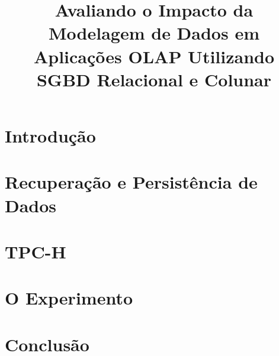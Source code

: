 \documentclass[12pt]{article}
\begin{document}
 

\title{Avaliando o Impacto da Modelagem de Dados em Aplicações OLAP Utilizando SGBD Relacional e Colunar}
\author{}
\address{}

\maketitle

\begin{abstract}
\end{abstract}
     
\begin{resumo}
\end{resumo}

\section{Introdução}




\section{Recuperação e Persistência de Dados}

\section{TPC-H}

\section{O Experimento}

\section{Conclusão}


\nocite{*}


\end{document}

